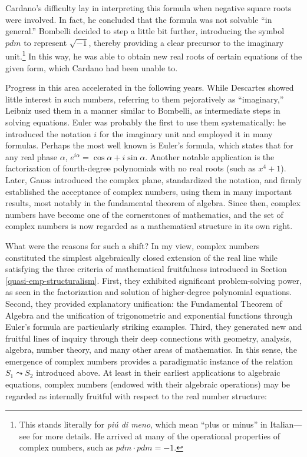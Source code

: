 \documentclass[11pt,a4paper]{article}
\begin{document}
Cardano’s difficulty lay in interpreting this formula when negative square roots were involved. In fact, he concluded that the formula was not solvable “in general.” Bombelli decided to step a little bit further, introducing the symbol $pdm$ to represent $\sqrt{-1}$, thereby providing a clear precursor to the imaginary unit.\footnote{This stands literally for \textit{piú di meno}, which mean “plus or minus” in Italian—see \textcite{Christen2018} for more details. He arrived at many of the operational properties of complex numbers, such as $pdm \cdot pdm = -1$.} In this way, he was able to obtain new real roots of certain equations of the given form, which Cardano had been unable to.

Progress in this area accelerated in the following years. While Descartes showed little interest in such numbers, referring to them pejoratively as “imaginary,” Leibniz used them in a manner similar to Bombelli, as intermediate steps in solving equations. Euler was probably the first to use them systematically: he introduced the notation $i$ for the imaginary unit and employed it in many formulas. Perhaps the most well known is Euler's formula, which states that for any real phase $\alpha$, $e^{i\alpha} = \cos \alpha + i \sin \alpha$. Another notable application is the factorization of fourth-degree polynomials with no real roots (such as $x^4 + 1$). Later, Gauss introduced the complex plane, standardized the notation, and firmly established the acceptance of complex numbers, using them in many important results, most notably in the fundamental theorem of algebra. Since then, complex numbers have become one of the cornerstones of mathematics, and the set of complex numbers is now regarded as a mathematical structure in its own right.

What were the reasons for such a shift? In my view, complex numbers constituted the simplest algebraically closed extension of the real line while satisfying the three criteria of mathematical fruitfulness introduced in Section \ref{quasi-emp-structuralism}. First, they exhibited significant problem-solving power, as seen in the factorization and solution of higher-degree polynomial equations. Second, they provided explanatory unification: the Fundamental Theorem of Algebra and the unification of trigonometric and exponential functions through Euler's formula are particularly striking examples. Third, they generated new and fruitful lines of inquiry through their deep connections with geometry, analysis, algebra, number theory, and many other areas of mathematics. In this sense, the emergence of complex numbers provides a paradigmatic instance of the relation $S_1 \leadsto S_2$ introduced above. At least in their earliest applications to algebraic equations, complex numbers (endowed with their algebraic operations) may be regarded as internally fruitful with respect to the real number structure:
\end{document}
